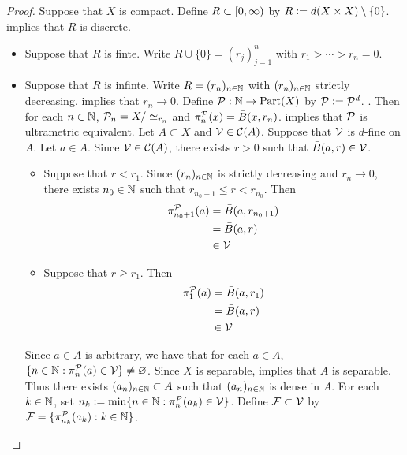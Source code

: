 \documentclass{book}
\begin{document}
	\begin{proof}
		Suppose that $X$ is compact. Define $R \subset [0,\infty)$ by $R \vcentcolon= d(X \times X) \setminus \{0\}$.  implies that $R$ is discrete. 
		\begin{itemize}
			\item Suppose that $R$ is finte. Write $R \cup \{0\} = (r_j)_{j=1}^n$ with $r_1 > \cdots > r_n = 0$.  
			\item Suppose that $R$ is infinte. Write $R = (r_n)_{n \in \mathbb{N}}$ with $(r_n)_{n \in \mathbb{N}}$ strictly decreasing.  implies that $r_n \rightarrow 0$. Define $\mathcal{P}: \mathbb{N} \rightarrow \text{Part}(X)$ by $\mathcal{P} \vcentcolon= \mathcal{P}^d$. . Then for each $n \in \mathbb{N}$, $\mathcal{P}_n = X/\simeq_{r_n}$ and $\pi^{\mathcal{P}}_n(x) = \bar{B}(x, r_n)$.  implies that $\mathcal{P}$ is ultrametric equivalent. Let $A \subset X$ and $\mathcal{V} \in \mathcal{C}(A)$. Suppose that $\mathcal{V}$ is $d$-fine on $A$. Let $a \in A$. Since $\mathcal{V} \in \mathcal{C}(A)$, there exists $r > 0$ such that $\bar{B}(a, r) \in \mathcal{V}$. 
			\begin{itemize}
				\item Suppose that $r < r_1$. Since $(r_n)_{n \in \mathbb{N}}$ is strictly decreasing and $r_n \rightarrow 0$, there exists $n_0 \in \mathbb{N}$ such that $r_{n_0 + 1} \leq r < r_{n_0}$. Then  
				\begin{align*}
					\pi^{\mathcal{P}}_{n_0+1}(a)
					& = \bar{B}(a, r_{n_0+1}) \\
					& = \bar{B}(a, r) \\
					& \in \mathcal{V} 
				\end{align*}
				\item Suppose that $r \geq r_1$. Then 
				\begin{align*}
					\pi^{\mathcal{P}}_1(a)
					& = \bar{B}(a, r_1) \\
					& = \bar{B}(a, r) \\
					& \in \mathcal{V} 
				\end{align*}
			\end{itemize}
			Since $a \in A$ is arbitrary, we have that for each $a \in A$, $\{n \in \mathbb{N}: \pi^{\mathcal{P}}_n(a) \in \mathcal{V} \} \neq \varnothing$. Since $X$ is separable,  implies that $A$ is separable. Thus there exists $(a_n)_{n \in \mathbb{N}} \subset A$ such that $(a_n)_{n \in \mathbb{N}}$ is dense in $A$. For each $k \in \mathbb{N}$, set $n_k \vcentcolon= \min \{n \in \mathbb{N}: \pi^{\mathcal{P}}_n(a_k) \in \mathcal{V} \}$. Define $\mathcal{F} \subset \mathcal{V}$ by $\mathcal{F} = \{\pi^{\mathcal{P}}_{n_k}(a_k): k \in \mathbb{N}\}$. 

\end{itemize}
\end{proof}
\end{document}
